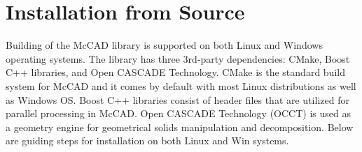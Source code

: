\documentclass[letterpaper, 12 pt]{report}
\begin{document}
\section{Installation from Source} \label{sec:Installation from Source}
Building of the McCAD library is supported on both Linux and Windows operating systems. The library has three 3rd-party dependencies: CMake, Boost C++ libraries, and Open CASCADE Technology. CMake is the standard build system for McCAD and it comes by default with most Linux distributions as well as Windows OS. Boost C++ libraries consist of header files that are utilized for parallel processing in McCAD. Open CASCADE Technology (OCCT) is used as a geometry engine for geometrical solids manipulation and decomposition. Below are guiding steps for installation on both Linux and Win systems. 
\end{document}
